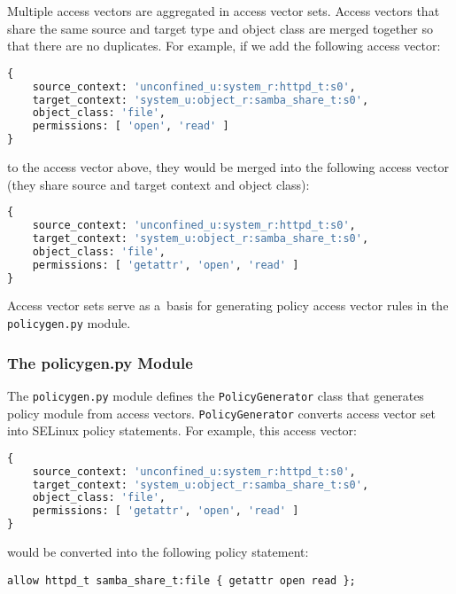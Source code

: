Multiple access vectors are aggregated in access vector sets. Access vectors
that share the same source and target type and object class are merged together
so that there are no duplicates. For example, if we add the following access
vector:
\begin{lstlisting}[language=Python]
{
    source_context: 'unconfined_u:system_r:httpd_t:s0',
    target_context: 'system_u:object_r:samba_share_t:s0',
    object_class: 'file',
    permissions: [ 'open', 'read' ]
}
\end{lstlisting}
to the access vector above, they would be merged into the following access
vector (they share source and target context and object class):
\begin{lstlisting}[language=Python]
{
    source_context: 'unconfined_u:system_r:httpd_t:s0',
    target_context: 'system_u:object_r:samba_share_t:s0',
    object_class: 'file',
    permissions: [ 'getattr', 'open', 'read' ]
}
\end{lstlisting}

Access vector sets serve as a~basis for generating policy access vector rules
in the \texttt{policygen.py} module.

\subsubsection{The policygen.py Module}
The \texttt{policygen.py} module defines the \texttt{PolicyGenerator} class that
generates policy module from access vectors. \texttt{PolicyGenerator} converts
access vector set into SELinux policy statements. For example, this access
vector:
\begin{lstlisting}[language=Python]
{
    source_context: 'unconfined_u:system_r:httpd_t:s0',
    target_context: 'system_u:object_r:samba_share_t:s0',
    object_class: 'file',
    permissions: [ 'getattr', 'open', 'read' ]
}
\end{lstlisting}
would be converted into the following policy statement:
\begin{lstlisting}
allow httpd_t samba_share_t:file { getattr open read };
\end{lstlisting}

